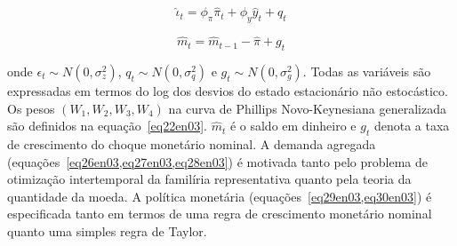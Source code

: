 \documentclass[twoside,a4paper,11pt]{report}
\begin{document}
\begin{equation}\label{eq29en03}
{\hat{\iota}}_{t}={\phi}_{\pi}{\hat{\pi}}_{t}+{\phi}_{y}{\hat{y}}_{t}+{q}_{t}
\end{equation}

\begin{equation}\label{eq30en03}
\hat{m}_{t} = \hat{m}_{t-1}-{\hat{\pi}}+g_{t}
\end{equation}

\noindent onde ${\epsilon}_{t}\sim N\left( 0,{\sigma}_{z}^{2}\right)$, ${q}_{t}\sim N\left( 0,{\sigma}_{q}^{2}\right)$ e ${g}_{t}\sim N\left( 0,{\sigma}_{g}^{2}\right)$. Todas as variáveis são expressadas em termos do log dos desvios do estado estacionário não estocástico. Os pesos $(W_{1},W_{2},W_{3},W_{4})$ na curva de Phillips Novo-Keynesiana generalizada são definidos na equação~\ref{eq22en03}. $\hat{m}_{t}$ é o saldo em dinheiro e $g_{t}$ denota a taxa de crescimento do choque monetário nominal. A demanda agregada (equações~\ref{eq26en03,eq27en03,eq28en03}) é motivada tanto pelo problema de otimização intertemporal da familíria representativa quanto pela teoria da quantidade da moeda. A política monetária (equações~\ref{eq29en03,eq30en03}) é especificada tanto em termos de uma regra de crescimento monetário nominal quanto uma simples regra de Taylor.







\end{document}
